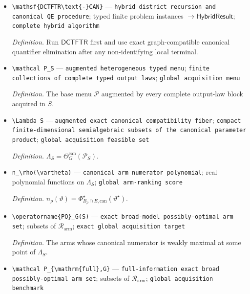 \documentclass{article}
\begin{document}
\begin{itemize}
  \item \texttt{\textbackslash{}\allowbreak{}mathsf\{DCTFTR\textbackslash{}\allowbreak{}text\{-\allowbreak{}\}\allowbreak{}CAN\}\allowbreak{}} --- \texttt{hybrid district recursion and canonical QE procedure}; typed finite problem instances \(\to\mathsf{HybridResult}\); \texttt{complete hybrid algorithm}
  \par\smallskip\noindent\emph{Definition.} Run \(\mathsf{DCTFTR}\) first and use exact graph-compatible canonical quantifier elimination after any non-identifying local terminal.
  \item \texttt{\textbackslash{}\allowbreak{}mathcal P\_\allowbreak{}S} --- \texttt{augmented heterogeneous typed menu}; \texttt{finite collections of complete typed output laws}; \texttt{global acquisition menu}
  \par\smallskip\noindent\emph{Definition.} The base menu \(\mathcal P\) augmented by every complete output-law block acquired in \(S\).
  \item \texttt{\textbackslash{}\allowbreak{}Lambda\_\allowbreak{}S} --- \texttt{augmented exact canonical compatibility fiber}; \texttt{compact finite-\allowbreak{}dimensional semialgebraic subsets of the canonical parameter product}; \texttt{global acquisition feasible set}
  \par\smallskip\noindent\emph{Definition.} \(\Lambda_S=\Theta_G^{\mathrm{can}}(\mathcal P_S)\).
  \item \texttt{n\_\allowbreak{}\textbackslash{}\allowbreak{}rho(\textbackslash{}\allowbreak{}vartheta)} --- \texttt{canonical arm numerator polynomial}; real polynomial functions on \(\Lambda_S\); \texttt{global arm-\allowbreak{}ranking score}
  \par\smallskip\noindent\emph{Definition.} \(n_\rho(\vartheta)=\Phi_{B_\rho\cap E,\mathrm{can}}^\star(\vartheta^\star)\).
  \item \texttt{\textbackslash{}\allowbreak{}operatorname\{PO\}\allowbreak{}\_\allowbreak{}G(S)} --- \texttt{exact broad-\allowbreak{}model possibly-\allowbreak{}optimal arm set}; subsets of \(\mathcal R_{\mathrm{arm}}\); \texttt{exact global acquisition target}
  \par\smallskip\noindent\emph{Definition.} The arms whose canonical numerator is weakly maximal at some point of \(\Lambda_S\).
  \item \texttt{\textbackslash{}\allowbreak{}mathcal P\_\allowbreak{}\{\textbackslash{}\allowbreak{}mathrm\{full\}\allowbreak{},\allowbreak{}G\}\allowbreak{}} --- \texttt{full-\allowbreak{}information exact broad possibly-\allowbreak{}optimal arm set}; subsets of \(\mathcal R_{\mathrm{arm}}\); \texttt{global acquisition benchmark}

\end{itemize}
\end{document}
